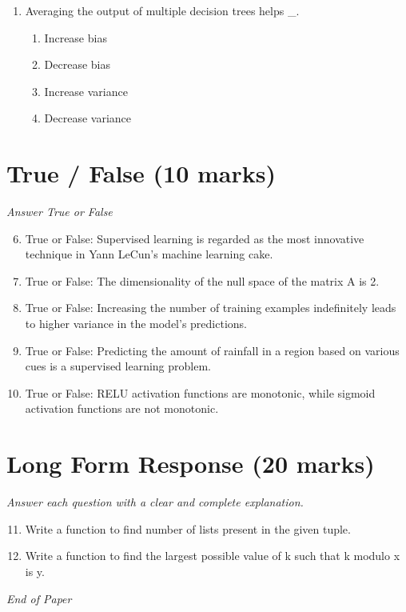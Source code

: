 \documentclass[12pt]{article}
\begin{document}
\begin{enumerate}[label=\arabic*.]
\begin{enumerate}[label=(\alph*)]
    \item they have high variance
    \item they are not consistent estimators
    \item None of the above
\end{enumerate}
\item Averaging the output of multiple decision trees helps \_.
\begin{enumerate}[label=(\alph*)]
    \item Increase bias
    \item Decrease bias
    \item Increase variance
    \item Decrease variance
\end{enumerate}
\end{enumerate}

\section*{True / False (10 marks)}
\textit{Answer True or False}
\begin{enumerate}[label=\arabic*.]
\setcounter{enumi}{5}
\item True or False: Supervised learning is regarded as the most innovative technique in Yann LeCun's machine learning cake.
\item True or False: The dimensionality of the null space of the matrix A is 2.
\item True or False: Increasing the number of training examples indefinitely leads to higher variance in the model's predictions.
\item True or False: Predicting the amount of rainfall in a region based on various cues is a supervised learning problem.
\item True or False: RELU activation functions are monotonic, while sigmoid activation functions are not monotonic.
\end{enumerate}

\section*{Long Form Response (20 marks)}
\textit{Answer each question with a clear and complete explanation.}
\begin{enumerate}[label=\arabic*.]
\setcounter{enumi}{10}
\item Write a function to find number of lists present in the given tuple.
\item Write a function to find the largest possible value of k such that k modulo x is y.
\end{enumerate}

\vfill
\noindent\textit{End of Paper}
\end{document}
